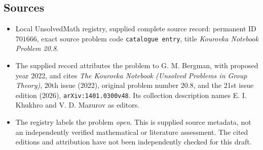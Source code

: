 \documentclass[11pt]{article}
\begin{document}
\subsection{Sources}
\begin{itemize}
\item Local UnsolvedMath registry, supplied complete source record: permanent ID \(701666\), exact source problem code \texttt{catalogue entry}, title \emph{Kourovka Notebook Problem 20.8}.
\item The supplied record attributes the problem to G. M. Bergman, with proposed year 2022, and cites \emph{The Kourovka Notebook (Unsolved Problems in Group Theory)}, 20th issue (2022), original problem number 20.8, and the 21st issue edition (2026), \texttt{arXiv:1401.0300v48}. Its collection description names E. I. Khukhro and V. D. Mazurov as editors.
\item The registry labels the problem \emph{open}. This is supplied source metadata, not an independently verified mathematical or literature assessment. The cited editions and attribution have not been independently checked for this draft.
\end{itemize}
\end{document}
